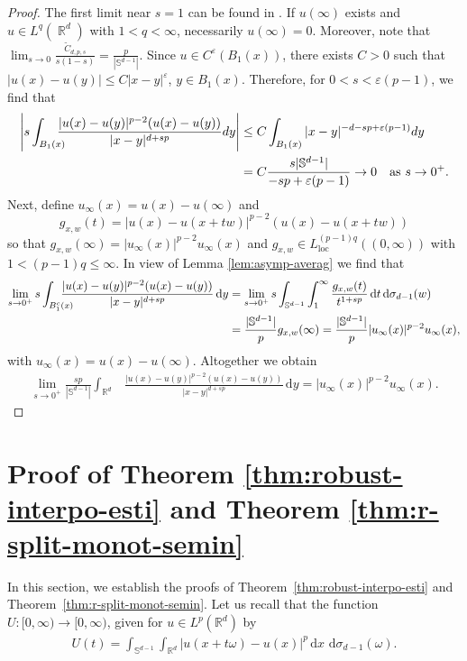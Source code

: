 \documentclass[12pt, reqno]{amsart}%
\theoremstyle{plain}  %
\theoremstyle{definition}  %
\theoremstyle{remark}
\numberwithin{equation}{section}
\DeclareMathOperator{\R}{\mathbb{R}}
\renewcommand{\d}{\,\mathrm{d}}
\begin{document}
\begin{proof}
The first limit near $s=1$ can be found in \cite[Section 9]{Fog25}. If $u(\infty)$ exists and $u\in L^q( \R^d)$ with $1<q<\infty$, necessarily $u(\infty)=0.$ Moreover, note that $\lim_{s\to0}\frac{ \widetilde{C}_{d,p,s}}{s(1-s)}
=\frac{p}{|\mathbb S^{d-1}|}.$  Since $u\in C^\varepsilon(B_1(x))$, there exists $C>0$ such that $|u(x)-u(y)| \leq C |x-y|^\varepsilon$, $y\in B_1(x)$. Therefore, for  $0<s<\varepsilon(p-1)$, we find that
\begin{align*}
\left|
s\int_{B_1(x)}\hspace{-2ex}
\frac{|u(x)-u(y)|^{p-2}(u(x)-u(y))}
{|x-y|^{d+sp}}dy
\right|
&\leq C
\int_{B_1(x)}
|x-y|^{-d-sp+\varepsilon(p-1)}dy \\
&=C\frac{ s|\mathbb S^{d-1}|}{ -sp+\varepsilon(p-1)} \to 0
\quad \text{as } s\to0^+.
\end{align*}
Next,  define $u_\infty(x)= u(x)-u(\infty)$ and 
$$g_{x, w}(t)= |u(x)-u(x+t w)|^{p-2}(u(x)-u(x+t w))$$ 
so that $g_{x,w}(\infty)
=
|u_\infty(x)|^{p-2}u_\infty(x)$  and $g_{x, w}\in L^{(p-1)q}_{\mathrm{loc}}((0,\infty))$ with $1<(p-1)q\leq \infty$. In view of Lemma \ref{lem:asymp-averag} we find that
\begin{align*}
\lim_{s\to0^+}s\int_{B^c_1(x)}\hspace{-3ex}
\frac{|u(x)-u(y)|^{p-2}(u(x)-u(y))}
{|x-y|^{d+sp}}\d y&=
\lim_{s\to0^+}s\int_{\mathbb{S}^{d-1}} \int_1^\infty \frac{g_{x, w}(t)}{ t^{1+sp}}  \d t\d \sigma_{d-1}(w)\\
&=\frac{|\mathbb S^{d-1}|}{p}g_{x, w}(\infty)= \frac{|\mathbb S^{d-1}|}{p}|u_\infty(x)|^{p-2}u_\infty(x),
\end{align*}
with $u_\infty(x)= u(x)-u(\infty)$.  Altogether we obtain
\begin{align*}
\lim_{s\to0^+} \frac{sp}{|\mathbb S^{d-1}|}\int_{\R^d}
&\frac{|u(x)-u(y)|^{p-2}(u(x)-u(y))}
{|x-y|^{d+sp}}\d y= |u_\infty(x)|^{p-2}u_\infty(x).
\end{align*}
\end{proof}

\section{Proof of Theorem \ref{thm:robust-interpo-esti} and Theorem \ref{thm:r-split-monot-semin} }
\label{sec:robust-interpo}
In this section, we establish the proofs of Theorem~\ref{thm:robust-interpo-esti} and Theorem~\ref{thm:r-split-monot-semin}. Let us recall that the function $U \colon [0,\infty) \to [0,\infty)$, given for $u \in L^p(\mathbb{R}^d)$ by
\begin{align*}
U(t) = \int_{\mathbb{S}^{d-1}} \int_{\mathbb{R}^d} |u(x + t\omega) - u(x)|^p \d x \, \d \sigma_{d-1}(\omega).
\end{align*}
\end{document}
